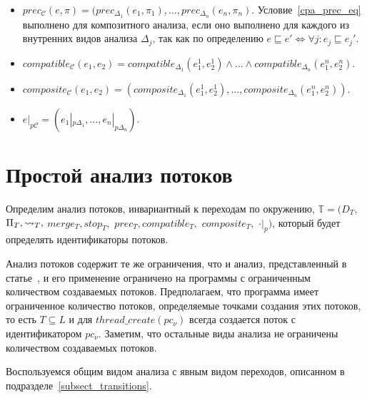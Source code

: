 \begin{itemize}
\item 
$prec_{\mathscr{C}}(e,\pi)=(prec_{\Delta_1}(e_1, \pi_1), \dots, prec_{\Delta_n}(e_n, \pi_n)$. Условие~\ref{cpa_prec_eq} выполнено для композитного анализа, если оно выполнено для каждого из внутренних видов анализа $\Delta_j$, так как по определению $e \sqsubseteq e' \iff \forall j: e_j \sqsubseteq e_j'$.

\item 
$compatible_{\mathscr{C}}(e_1, e_2) = compatible_{\Delta_1}(e^1_1, e^1_2) \land \dots \land compatible_{\Delta_n}(e^n_1, e^n_2)$.

\item 
$composite_{\mathscr{C}}(e_1, e_2) = (composite_{\Delta_1}(e^1_1, e^1_2), \dots, composite_{\Delta_n}(e^n_1, e^n_2))$.

\item 
$e|_{p\mathscr{C}} = (e_1|_{p\Delta_1}, \dots, e_n|_{p\Delta_n})$.

\end{itemize}
\section{Простой анализ потоков}
\label{sect_thread_analysis}
Определим анализ потоков, инвариантный к переходам по окружению, 
$\mathbb{T}=(D_{T},$ $\Pi_{T}, \leadsto_{T},$ $merge_{T}, stop_{T},$ $prec_{T}, compatible_{T},$ $composite_{T},$ $\cdot|_p)$, который будет определять идентификаторы потоков.

Анализ потоков содержит те же ограничения, что и анализ, представленный в статье~\cite{ThreadModular03}, и его применение ограничено на программы с ограниченным количеством создаваемых потоков.
Предполагаем, что программа имеет ограниченное количество потоков, определяемые точками создания этих потоков, то есть $T\subseteq L$ и для $thread\_create(pc_\nu)$ всегда создается поток с идентификатором $pc_\nu$.
Заметим, что остальные виды анализа не ограничены количеством создаваемых потоков.

Воспользуемся общим видом анализа с явным видом переходов, описанном в подразделе~\ref{subsect_transitions}.


